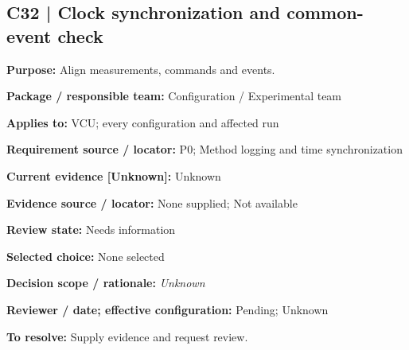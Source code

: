 \documentclass[11pt]{article}
\begin{document}
\par\noindent\begin{minipage}{\textwidth}\small\setlength{\parskip}{2pt}
\subsection*{C32 | Clock synchronization and common-event check}
\textbf{Purpose:} Align measurements, commands and events.\par
\textbf{Package / responsible team:} Configuration / Experimental team\par
\textbf{Applies to:} VCU; every configuration and affected run\par
\textbf{Requirement source / locator:} P0; Method logging and time synchronization\par
\textbf{Current evidence [Unknown]:} Unknown\par
\textbf{Evidence source / locator:} None supplied; Not available\par
\textbf{Review state:} Needs information\par
\textbf{Selected choice:} None selected\par
\textbf{Decision scope / rationale:} \textit{Unknown}\par
\textbf{Reviewer / date; effective configuration:} Pending; Unknown\par
\textbf{To resolve:} Supply evidence and request review.\par
\end{minipage}\par\vspace{5pt}
\end{document}

